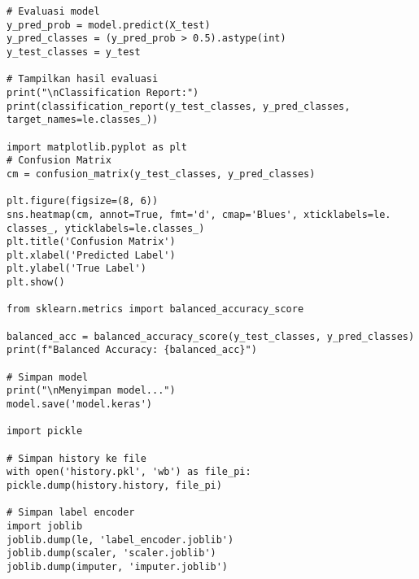 \documentclass[a4paper,12pt]{report}
\begin{document}
\begin{lstlisting}
# Evaluasi model
y_pred_prob = model.predict(X_test)
y_pred_classes = (y_pred_prob > 0.5).astype(int)
y_test_classes = y_test

# Tampilkan hasil evaluasi
print("\nClassification Report:")
print(classification_report(y_test_classes, y_pred_classes, 
target_names=le.classes_))

import matplotlib.pyplot as plt
# Confusion Matrix
cm = confusion_matrix(y_test_classes, y_pred_classes)

plt.figure(figsize=(8, 6))
sns.heatmap(cm, annot=True, fmt='d', cmap='Blues', xticklabels=le.
classes_, yticklabels=le.classes_)
plt.title('Confusion Matrix')
plt.xlabel('Predicted Label')
plt.ylabel('True Label')
plt.show()

from sklearn.metrics import balanced_accuracy_score

balanced_acc = balanced_accuracy_score(y_test_classes, y_pred_classes)
print(f"Balanced Accuracy: {balanced_acc}")

# Simpan model
print("\nMenyimpan model...")
model.save('model.keras')

import pickle

# Simpan history ke file
with open('history.pkl', 'wb') as file_pi:
pickle.dump(history.history, file_pi)

# Simpan label encoder
import joblib
joblib.dump(le, 'label_encoder.joblib')
joblib.dump(scaler, 'scaler.joblib')
joblib.dump(imputer, 'imputer.joblib')


\end{lstlisting}
\end{document}
